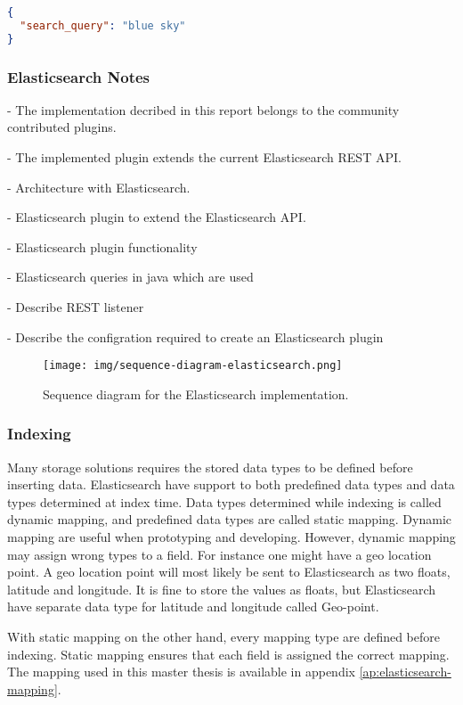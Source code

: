 \begin{lstlisting}[language=json, caption={The POST request body for the implemented query expansion.}, label={lst:rest-api-extension}]
{
  "search_query": "blue sky"
}
\end{lstlisting}

\subsubsection{Elasticsearch Notes}
- The implementation decribed in this report belongs to the community contributed plugins.

- The implemented plugin extends the current Elasticsearch REST API.

- Architecture with Elasticsearch.

- Elasticsearch plugin to extend the Elasticsearch API.

- Elasticsearch plugin functionality

- Elasticsearch queries in java which are used

- Describe REST listener

- Describe the configration required to create an Elasticsearch plugin

\begin{figure}[h!]
\centering \texttt{[image: img/sequence-diagram-elasticsearch.png]}
\caption{Sequence diagram for the Elasticsearch implementation.}
\label{fig:sequence-diagram-lucene}
\end{figure}

\subsubsection{Indexing}
Many storage solutions requires the stored data types to be defined before inserting data.
Elasticsearch have support to both predefined data types and data types determined at index time.
Data types determined while indexing is called dynamic mapping, and predefined data types are called static mapping.
Dynamic mapping are useful when prototyping and developing.
However, dynamic mapping may assign wrong types to a field.
For instance one might have a geo location point.
A geo location point will most likely be sent to Elasticsearch as two floats, latitude and longitude.
It is fine to store the values as floats, but Elasticsearch have separate data type for latitude and longitude called Geo-point.

With static mapping on the other hand, every mapping type are defined before indexing.
Static mapping ensures that each field is assigned the correct mapping.
The mapping used in this master thesis is available in appendix \ref{ap:elasticsearch-mapping}.

